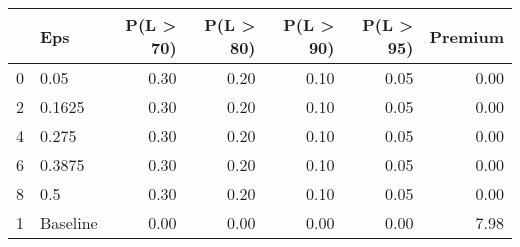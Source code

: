 \begin{tabular}{llrrrrr}
\toprule
{} &       Eps &  P(L > 70) &  P(L > 80) &  P(L > 90) &  P(L > 95) &  Premium \\
\midrule
0 &      0.05 &       0.30 &       0.20 &       0.10 &       0.05 &     0.00 \\
2 &    0.1625 &       0.30 &       0.20 &       0.10 &       0.05 &     0.00 \\
4 &     0.275 &       0.30 &       0.20 &       0.10 &       0.05 &     0.00 \\
6 &    0.3875 &       0.30 &       0.20 &       0.10 &       0.05 &     0.00 \\
8 &       0.5 &       0.30 &       0.20 &       0.10 &       0.05 &     0.00 \\
1 &  Baseline &       0.00 &       0.00 &       0.00 &       0.00 &     7.98 \\
\bottomrule
\end{tabular}
